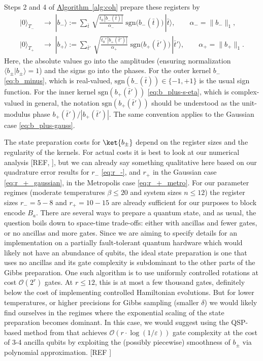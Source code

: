 Steps 2 and 4 of \hyperref[alg:coh]{Algorithm~\ref*{alg:coh}} prepare these registers by
\begin{equation}
    \begin{split}
        |0\rangle_{T_-} &\;\longrightarrow\; |b_-\rangle := \sum_{\bar t}\, \sqrt{\frac{t_0\,|b_-(\bar t)|}{\alpha_-}}\;\mathrm{sgn}\!\big(b_-(\bar t)\big)\,|\bar t\rangle, \qquad \alpha_- = \|b_-\|_1, \\
        |0\rangle_{T_+} &\;\longrightarrow\; |b_+\rangle := \sum_{\bar t'}\, \sqrt{\frac{t_0'\,|b_+(\bar t')|}{\alpha_+}}\;\mathrm{sgn}\!\big(b_+(\bar t')\big)\,|\bar t'\rangle, \qquad \alpha_+ = \|b_+\|_1.
    \end{split}
\end{equation}
Here, the absolute values go into the amplitudes (ensuring normalization $\langle b_\pm | b_\pm \rangle = 1$) and the signs go into the phases. For the outer kernel $b_-$ \eqref{eq:b_minus}, which is real-valued, $\mathrm{sgn}(b_-(\bar t)) \in \{-1,+1\}$ is the usual sign function. For the inner kernel $\mathrm{sgn}(b_+(\bar t'))$ \eqref{eq:b_plus-s-eta}, which is complex-valued in general, the notation $\mathrm{sgn}(b_+(\bar t'))$ should be understood as the unit-modulus phase $b_+(\bar t')/|b_+(\bar t')|$. The same convention applies to the Gaussian case \eqref{eq:b_plus-gauss}. 

The state preparation costs for $\ket{b_\pm}$ depend on the register sizes and the regularity of the kernels. For actual costs it is best to look at our numerical analysis [REF, ], but we can already say something qualitative here based on our quadrature error results for $r_-$ \eqref{eq:r_-}, and $r_+$ in the Gaussian case \eqref{eq:r_+_gaussian}, in the Metropolis case \eqref{eq:r_+_metro}. For our parameter regimes (moderate temperatures $\beta \leq 20$ and system sizes $n \leq 12$) the register sizes $r_- = 5-8$ and $r_+ = 10-15$ are already sufficient for our purposes to block encode $B_a$. There are several ways to prepare a quantum state, and as usual, the question boils down to space-time trade-offs: either with ancillas and fewer gates, or no ancillas and more gates. Since we are aiming to specify details for an implementation on a partially fault-tolerant quantum hardware which would likely not have an abundance of qubits, the ideal state preparation is one that uses no ancillas and its gate complexity is subdominant to the other parts of the Gibbs preparation. One such algorithm is to use uniformly controlled rotations \cite{mottonen2004transformation,shende2008cnot,plesch2011quantum} at cost $\mathcal{O}(2^r)$ gates. At $r \leq 12$, this is at most a few thousand gates, definitely below the cost of implementing controlled Hamiltonian evolutions. But for lower temperatures, or higher precisions for Gibbs sampling (smaller $\delta$) we would likely find ourselves in the regimes where the exponential scaling of the state preparation becomes dominant. In this case, we would suggest using the QSP-based method from \cite{mcardle2022quantum} that achieves $\mathcal{O}(r \cdot \log(1 / \varepsilon))$ gate complexity at the cost of 3-4 ancilla qubits by exploiting the (possibly piecewise) smoothness of $b_\pm$ via polynomial approximation. [REF ]

